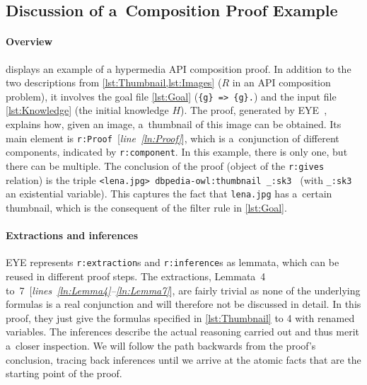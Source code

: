 \newcommand\lineref[1]{[\textit{line~\ref{#1}}]}
\newcommand\linesref[2]{[\textit{lines~\ref{#1}--\ref{#2}}]}


\subsection{Discussion of a~Composition Proof Example}\label{example}
\paragraph{\bfseries Overview}
 displays an example of a hypermedia API composition proof.
In addition to the two \restdesc descriptions from \cref{lst:Thumbnail,lst:Images}
($R$ in an API composition problem),
it involves the goal file \cref{lst:Goal} (\texttt{\{g\} => \{g\}.})
and the input file \cref{lst:Knowledge} (the initial knowledge $H$).
The proof, generated by EYE~\cite{eyepaper},
explains how, given an image, a~thumbnail of this image can be obtained.
Its main element is \verb!r:Proof!~\lineref{ln:Proof},
which is a~conjunction of different components, indicated by \verb!r:component!.
In this example, there is only one,
but there can be multiple.
The conclusion of the proof
(object of the \verb!r:gives! relation)
is the triple
\verb!<lena.jpg> dbpedia-owl:thumbnail _:sk3 !%
(with \verb!_:sk3! an existential variable).
This captures the fact that \verb!lena.jpg! has a~certain thumbnail,
which is the consequent of the filter rule in \cref{lst:Goal}.

\vspace{-1em}

\paragraph{\bfseries Extractions and inferences}
EYE represents \verb!r:extraction!s and \verb!r:inference!s as lemmata,
which can be reused in different proof steps.
The extractions, Lemmata~4 to~7~\linesref{ln:Lemma4}{ln:Lemma7}, are fairly trivial as none of the underlying formulas is a real conjunction and will therefore not be discussed in detail.
In this proof, they just give the formulas specified in \cref{lst:Thumbnail} to 4 with renamed variables.
The inferences describe the actual reasoning carried out
and thus merit a~closer inspection.
We will follow the path backwards from the proof's conclusion,
tracing back inferences until we arrive at the atomic facts
that are the starting point of the proof.


